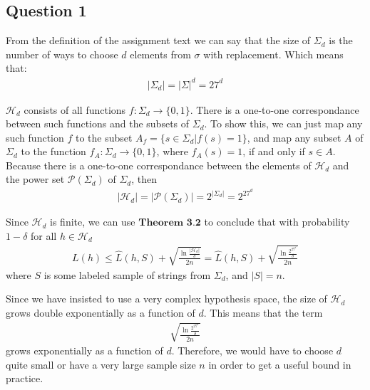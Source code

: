 \subsection{Question 1}
From the definition of the assignment text we can say that the size of $\Sigma_d$ is the number of ways to choose $d$ elements from $\sigma$ with replacement.
Which means that:
\begin{align}
|\Sigma_d| = |\Sigma|^d = 27^d 
\end{align}

$\mathcal{H}_d$ consists of all functions $f: \Sigma_d \to \{0,1\}$. There is a one-to-one correspondance between such functions and the subsets of $\Sigma_d$. To show this, we can just map any such function $f$ to the subset $A_f = \{ s \in \Sigma_d | f(s) = 1 \}$, and map any subset $A$ of $\Sigma_d$ to the function $f_A: \Sigma_d \to \{0,1\}$, where $f_A(s)=1$, if and only if $s\in A$. Because there is a one-to-one correspondance between the elements of $\mathcal{H}_d$ and the power set $\mathcal{P}(\Sigma_d)$ of $\Sigma_d$, then
\begin{align}
|\mathcal{H}_d| = |\mathcal{P}(\Sigma_d)| = 2^{|\Sigma_d|}=2^{27^d}
\end{align}

Since $\mathcal{H}_d$ is finite, we can use $\textbf{Theorem 3.2}$ to conclude that with probability $1 - \delta$ for all $h \in \mathcal{H}_d$
\begin{align}
L(h) \leq \hat{L}(h, S) + \sqrt{\frac{\ln \frac{|\mathcal{H}_d|}{\delta}}{2n}} = \hat{L}(h, S) + \sqrt{\frac{\ln \frac{2^{27^d}}{\delta}}{2n}}
\end{align}
where $S$ is some labeled sample of strings from $\Sigma_d$, and $|S|=n$. 

Since we have insisted to use a very complex hypothesis space, the size of $\mathcal{H}_d$ grows double exponentially as a function of $d$. This means that the term 
\begin{align}
\sqrt{\frac{\ln \frac{2^{27^d}}{\delta}}{2n}}
\end{align}
grows exponentially as a function of $d$. Therefore, we would have to choose $d$ quite small or have a very large sample size $n$ in order to get a useful bound in practice.


